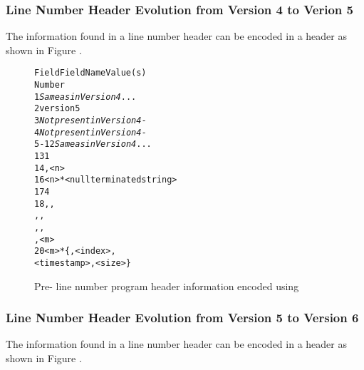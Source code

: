 \subsubsection{Line Number Header Evolution from Version 4 to Verion 5}
The information found in a \DWARFVersionIV{} line number 
header can be encoded in a \DWARFVersionV{} header
as shown in Figure .

\begin{figure}[ht]
\begin{dwflisting}
\begin{alltt}
  Field           Field Name                      Value(s)
  Number
     1    \textit{Same as in Version 4}            ...
     2    version                         5
     3    \textit{Not present in Version 4}        -
     4    \textit{Not present in Version 4}        -
   5-12   \textit{Same as in Version 4}            ...
    13    \HFNdirectoryentryformatcount{}    1
    14    \HFNdirectoryentryformat{}          \DWLNCTpath,     \HFNdirectoriescount{}               <n>
    16    \HFNdirectories{}                     <n>*<null terminated string>
    17    \HFNfilenameentryformatcount{}    4
    18    \HFNfilenameentryformat{}          \DWLNCTpath, \DWFORMstring,
                                          \DWLNCTdirectoryindex, \DWFORMudata,
                                          \DWLNCTtimestamp, \DWFORMudata,
                                          \DWLNCTsize,     \HFNfilenamescount{}                <m>
    20    \HFNfilenames{}                      <m>*\{<null terminated string>, <index>, 
                                               <timestamp>, <size>\}
\end{alltt}
\end{dwflisting}
\begin{centering}
\caption{Pre-\DWARFVersionV{} line number program header information \mbox{encoded} using \DWARFVersionV}
\label{fig:preV5LNCTusingV5}
\end{centering}
\end{figure}


\subsubsection{Line Number Header Evolution from Version 5 to Version 6}
\bb
The information found in a \DWARFVersionV{} line number 
header can be encoded in a \DWARFVersionVI{} header
as shown in Figure .
\eb

